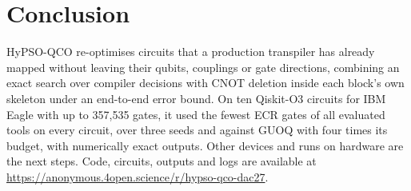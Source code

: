 \documentclass[conference,letterpaper]{IEEEtran}
\newcommand{\hypso}{HyPSO-QCO}
\begin{document}
\section{Conclusion}
\hypso{} re-optimises circuits that a production transpiler has already mapped without leaving their qubits,
couplings or gate directions, combining an exact search over compiler decisions with CNOT deletion inside each
block's own skeleton under an end-to-end error bound. On ten Qiskit-O3 circuits for IBM Eagle with up to
357,535 gates, it used the fewest ECR gates of all evaluated tools on every circuit, over three seeds and
against GUOQ with four times its budget, with numerically exact outputs. Other devices and runs on hardware are
the next steps. Code, circuits, outputs and logs are available at
\url{https://anonymous.4open.science/r/hypso-qco-dac27}.
\end{document}
